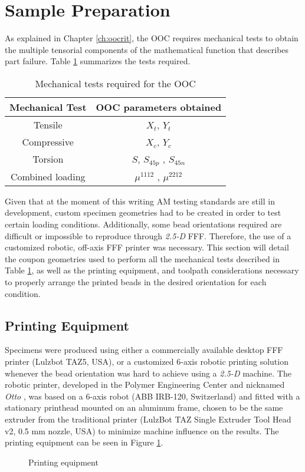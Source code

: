 \documentclass[main.tex]{subfiles}
\begin{document}
\section{Sample Preparation}

As explained in Chapter \ref{ch:oocrit}, the OOC requires mechanical tests to obtain the multiple tensorial components of the mathematical function that describes part failure. Table \ref{tab:testsum} summarizes the tests required.
\begin{table} [h]
\centering
\caption{Mechanical tests required for the OOC}
\begin{tabular}{ c c } 
	\toprule
	\textbf{Mechanical Test} & \textbf{OOC parameters obtained} \\
	\midrule
	Tensile           &   $X_t$, $Y_t$\\
	Compressive       &   $X_c$, $Y_c$\\
	Torsion           &   $S$, $S_{45p}$ , $S_{45n}$\\
	Combined loading  &   $\mu^{1112}$ , $\mu^{2212}$\\
 	\bottomrule
\end{tabular}
\label{tab:testsum}
\end{table}

Given that at the moment of this writing AM testing standards are still in development, custom specimen geometries had to be created in order to test certain loading conditions. Additionally, some bead orientations required are difficult or impossible to reproduce through \emph{2.5-D} FFF. Therefore, the use of a customized robotic, off-axis FFF printer was necessary. This section will detail the coupon geometries used to perform all the mechanical tests described in Table \ref{tab:testsum}, as well as the printing equipment, and toolpath considerations necessary to properly arrange the printed beads in the desired orientation for each condition. 

\subsection{Printing Equipment}
Specimens were produced using either a commercially available desktop FFF printer (Lulzbot TAZ5, USA), or a customized 6-axis robotic printing solution whenever the bead orientation was hard to achieve using a \emph{2.5-D} machine. The robotic printer, developed in the Polymer Engineering Center and nicknamed \emph{Otto} \cite{VanHulle2017}, was based on a 6-axis robot (ABB IRB-120, Switzerland) and fitted with a stationary printhead mounted on an aluminum frame, chosen to be the same extruder from the traditional printer (LulzBot TAZ Single Extruder Tool Head v2, 0.5 mm nozzle, USA) to minimize machine influence on the results. The printing equipment can be seen in Figure \ref{fig:PrintEquip}. 
\begin{figure}[h]
	\center
	\hfill
	\caption{Printing equipment} \label{fig:PrintEquip}
\end{figure}
\end{document}
